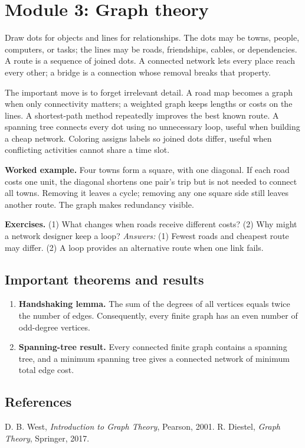 \documentclass[11pt,oneside]{book}
\makeatletter
\renewenvironment{thebibliography}[1]
  {\list{\@biblabel{\@arabic\c@enumiv}}%
    {\settowidth\labelwidth{\@biblabel{#1}}%
     \leftmargin\labelwidth
     \advance\leftmargin\labelsep
     \usecounter{enumiv}%
     \let\p@enumiv\@empty
     \renewcommand\theenumiv{\@arabic\c@enumiv}}}
  {\endlist}
\makeatother
\begin{document}
\chapter[Module 3: Graph theory]{Module 3: Graph theory}
Draw dots for objects and lines for relationships. The dots may be towns, people, computers, or tasks; the lines may be roads, friendships, cables, or dependencies. A route is a sequence of joined dots. A connected network lets every place reach every other; a bridge is a connection whose removal breaks that property.

The important move is to forget irrelevant detail. A road map becomes a graph when only connectivity matters; a weighted graph keeps lengths or costs on the lines. A shortest-path method repeatedly improves the best known route. A spanning tree connects every dot using no unnecessary loop, useful when building a cheap network. Coloring assigns labels so joined dots differ, useful when conflicting activities cannot share a time slot.

\textbf{Worked example.} Four towns form a square, with one diagonal. If each road costs one unit, the diagonal shortens one pair's trip but is not needed to connect all towns. Removing it leaves a cycle; removing any one square side still leaves another route. The graph makes redundancy visible.

\textbf{Exercises.} (1) What changes when roads receive different costs? (2) Why might a network designer keep a loop? \emph{Answers:} (1) Fewest roads and cheapest route may differ. (2) A loop provides an alternative route when one link fails.

\section*{Important theorems and results}
\begin{enumerate}[leftmargin=*,itemsep=0.35em]
\item \textbf{Handshaking lemma.} The sum of the degrees of all vertices equals twice the number of edges. Consequently, every finite graph has an even number of odd-degree vertices.

\item \textbf{Spanning-tree result.} Every connected finite graph contains a spanning tree, and a minimum spanning tree gives a connected network of minimum total edge cost.
\end{enumerate}

\section*{References}
\begin{thebibliography}{9}
 D. B. West, \emph{Introduction to Graph Theory}, Pearson, 2001.
 R. Diestel, \emph{Graph Theory}, Springer, 2017.
\end{thebibliography}
\end{document}

